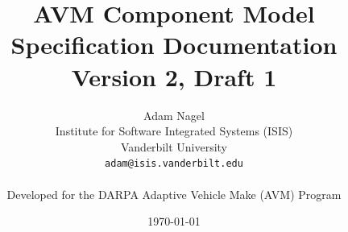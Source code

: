 \documentclass{report}
\begin{document}
\title{AVM Component Model Specification Documentation\\Version 2, Draft 1}
\author{Adam Nagel\\
	Institute for Software Integrated Systems (ISIS)\\
	Vanderbilt University\\
	\texttt{adam@isis.vanderbilt.edu}\\
	\\
	Developed for the DARPA Adaptive Vehicle Make (AVM) Program}
\date{\today}

\maketitle


\tableofcontents


\end{document}

